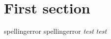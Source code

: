 \documentclass{article}
\newcommand\mygls\gls
\begin{document}
\section{First section}
\gls{spellingerror}
\mygls{spellingerror}
\textup{\textit{test}}
\textit{test}
\end{document}
